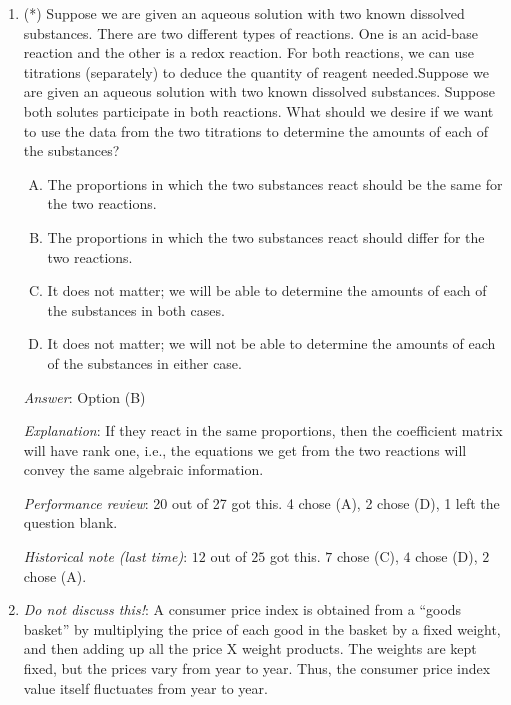 \documentclass[10pt]{amsart}
\begin{document}
\begin{enumerate}
  {\em Performance review}: 24 out of 27 got this. 2 chose (C), 1 chose (A).

  {\em Historical note (last time)}: $20$ out of $25$ got this. $4$ chose (A),
  $1$ chose (C).

\item (*) Suppose we are given an aqueous solution with two known
  dissolved substances. There are two different types of
  reactions. One is an acid-base reaction and the other is a redox
  reaction. For both reactions, we can use titrations (separately) to
  deduce the quantity of reagent needed.Suppose we are given an
  aqueous solution with two known dissolved substances. Suppose both
  solutes participate in both reactions. What should we desire if we
  want to use the data from the two titrations to determine the
  amounts of each of the substances?

  \begin{enumerate}[(A)]
  \item The proportions in which the two substances react should be
    the same for the two reactions.
  \item The proportions in which the two substances react should
    differ for the two reactions.
  \item It does not matter; we will be able to determine the amounts
    of each of the substances in both cases.
  \item It does not matter; we will not be able to determine the
    amounts of each of the substances in either case.
  \end{enumerate}

  {\em Answer}: Option (B)

  {\em Explanation}: If they react in the same proportions, then the
  coefficient matrix will have rank one, i.e., the equations we get
  from the two reactions will convey the same algebraic information.

  {\em Performance review}: 20 out of 27 got this. 4 chose (A), 2
  chose (D), 1 left the question blank.
 
  {\em Historical note (last time)}: $12$ out of $25$ got this. $7$ chose (C),
  $4$ chose (D), $2$ chose (A).

\item {\em Do not discuss this!}: A consumer price index is obtained
  from a ``goods basket'' by multiplying the price of each good in the
  basket by a fixed weight, and then adding up all the price X weight
  products. The weights are kept fixed, but the prices vary from year
  to year. Thus, the consumer price index value itself fluctuates from
  year to year.
  

\end{enumerate}
\end{document}
